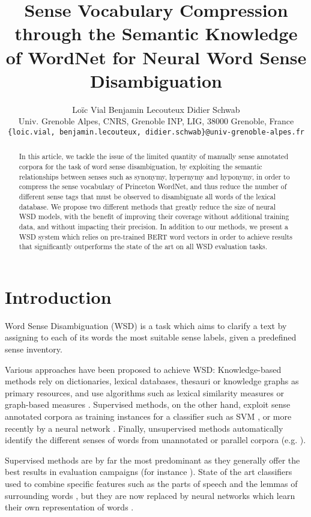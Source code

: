 \documentclass[11pt]{article}
\title{Sense Vocabulary Compression through the Semantic Knowledge of WordNet for Neural Word Sense Disambiguation}
\author{
    \vspace{5.0pt}
    Loïc Vial \quad Benjamin Lecouteux \quad Didier Schwab\\
    \vspace{5.0pt}
        Univ. Grenoble Alpes, CNRS, Grenoble INP, LIG, 38000 Grenoble, France\\
        \texttt{\{loic.vial, benjamin.lecouteux, didier.schwab\}@univ-grenoble-alpes.fr}
}
\date{}
\newcommand{\citep}[1]{\cite{#1}}
\newcommand{\citet}[1]{\newcite{#1}}
\begin{document}
\maketitle

\begin{abstract}
In this article, we tackle the issue of the limited quantity of manually sense annotated corpora for the task of word sense disambiguation, 
by exploiting 
the semantic relationships between senses such as synonymy, hypernymy and hyponymy, in order to compress the sense vocabulary of Princeton WordNet, and thus reduce the number of different sense tags that must be observed to disambiguate all words of the lexical database. 
We propose two different methods that 
greatly reduce 
the size of neural WSD models, 
with the benefit of improving their coverage without additional training data, and without impacting their precision. 
In addition to our methods, we present 
a WSD system which relies on pre-trained BERT word vectors 
in order to achieve results 
that significantly outperforms the state of the art on all WSD evaluation tasks. 
\end{abstract}

\section{Introduction}

Word Sense Disambiguation (WSD) is a task which aims to clarify a text by assigning to each of its words the most suitable sense labels, given a predefined sense inventory.

Various approaches have been proposed to achieve WSD:
Knowledge-based methods rely on dictionaries, lexical databases, thesauri or knowledge graphs as primary resources, and use algorithms such as lexical similarity measures \citep{Lesk1986} or graph-based measures \citep{Moro2014EntityLM}. Supervised methods, on the other hand, exploit sense annotated corpora as training instances for a 
classifier such as SVM \citep{Chan2007,Zhong2010}, or more recently by a neural network \citep{kaageback2016word}. Finally, unsupervised methods automatically identify the different senses of words from unannotated or parallel corpora (e.g. \citet{ide2002}). 

Supervised methods are by far the most predominant as they generally offer the best results in evaluation campaigns (for instance \citep{Navigli2007}). State of the art classifiers used to combine 
specific features such as the parts of speech and the lemmas of surrounding words
\citep{Zhong2010}, 
but they are now replaced by 
neural networks which learn their own representation of words \citep{raganato2017,minh2018}.
\end{document}
